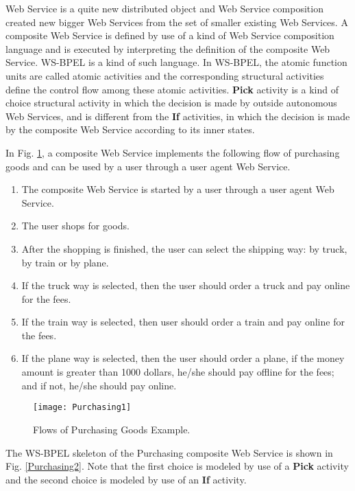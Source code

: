 \documentclass{fac}
\begin{document}
Web Service is a quite new distributed object and Web Service composition created new bigger Web Services from the set of smaller existing Web Services. A composite Web Service is defined by use of a kind of Web Service composition language and is executed by interpreting the definition of the composite Web Service. WS-BPEL\cite{WSBPEL} is a kind of such language. In WS-BPEL, the atomic function units are called atomic activities and the corresponding structural activities define the control flow among these atomic activities. \textbf{Pick} activity is a kind of choice structural activity in which the decision is made by outside autonomous Web Services, and is different from the \textbf{If} activities, in which the decision is made by the composite Web Service according to its inner states.

In Fig. \ref{Purchasing1}, a composite Web Service implements the following flow of purchasing goods and can be used by a user through a user agent Web Service.

\begin{enumerate}
  \item The composite Web Service is started by a user through a user agent Web Service.
  \item The user shops for goods.
  \item After the shopping is finished, the user can select the shipping way: by truck, by train or by plane.
  \item If the truck way is selected, then the user should order a truck and pay online for the fees.
  \item If the train way is selected, then user should order a train and pay online for the fees.
  \item If the plane way is selected, then the user should order a plane, if the money amount is greater than 1000 dollars, he/she should pay offline for the fees; and if not, he/she should pay online.
\end{enumerate}

\begin{figure}
  \centering
\texttt{[image: Purchasing1]}
  \caption{Flows of Purchasing Goods Example.}
  \label{Purchasing1}
\end{figure}

The WS-BPEL skeleton of the Purchasing composite Web Service is shown in Fig. \ref{Purchasing2}. Note that the first choice is modeled by use of a \textbf{Pick} activity and the second choice is modeled by use of an \textbf{If} activity.
\end{document}
